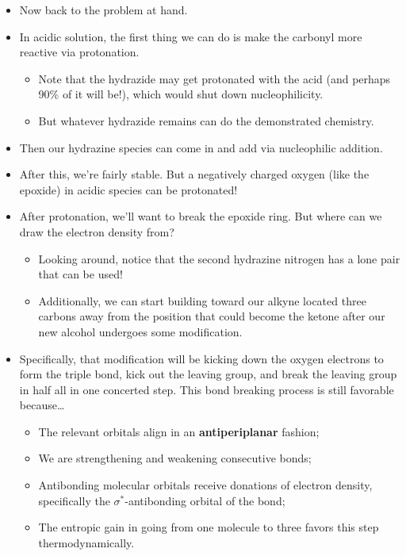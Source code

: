 \documentclass[../notes.tex]{subfiles}
\begin{document}
\begin{itemize}
\begin{itemize}
    \end{itemize}
    \item Now back to the problem at hand.
    \item In acidic solution, the first thing we can do is make the carbonyl more reactive via protonation.
    \begin{itemize}
        \item Note that the hydrazide may get protonated with the acid (and perhaps 90\% of it will be!), which would shut down nucleophilicity.
        \item But whatever hydrazide remains can do the demonstrated chemistry.
    \end{itemize}
    \item Then our hydrazine species can come in and add via nucleophilic addition.
    \item After this, we're fairly stable. But a negatively charged oxygen (like the epoxide) in acidic species can be protonated!
    \item After protonation, we'll want to break the epoxide ring. But where can we draw the electron density from?
    \begin{itemize}
        \item Looking around, notice that the second hydrazine nitrogen has a lone pair that can be used!
        \item Additionally, we can start building toward our alkyne located three carbons away from the position that could become the ketone after our new alcohol undergoes some modification.
    \end{itemize}
    \item Specifically, that modification will be kicking down the oxygen electrons to form the triple bond, kick out the leaving group, and break the leaving group in half all in one concerted step. This bond breaking process is still favorable because\dots
    \begin{itemize}
        \item The relevant orbitals align in an \textbf{antiperiplanar} fashion;
        \item We are strengthening and weakening consecutive bonds;
        \item Antibonding molecular orbitals receive donations of electron density, specifically the $\sigma^*$-antibonding orbital of the  bond;
        \item The entropic gain in going from one molecule to three favors this step thermodynamically.
    \end{itemize}

\end{itemize}
\end{document}
